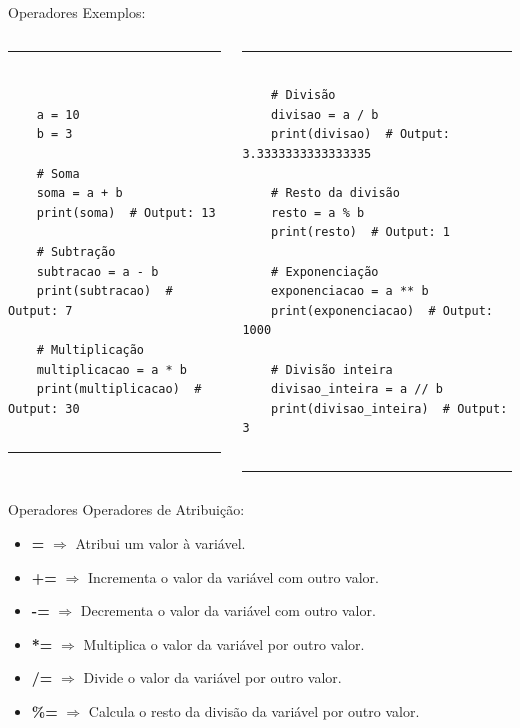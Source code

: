 \documentclass{beamer}
\begin{document}
\begin{frame}[fragile]{Operadores}
	\label{operadores_aritmeticos_exemplo}
	Exemplos:
	
	\begin{columns}
	\begin{column}{0.5\textwidth}
		
		\rule{\textwidth}{1pt}
		\scriptsize
\begin{verbatim}
	
	
	a = 10
	b = 3
	
	# Soma
	soma = a + b
	print(soma)  # Output: 13
	
	# Subtração
	subtracao = a - b
	print(subtracao)  # Output: 7
	
	# Multiplicação
	multiplicacao = a * b
	print(multiplicacao)  # Output: 30
	
\end{verbatim}
\rule{\textwidth}{1pt}
	\end{column}
	\begin{column}{0.5\textwidth}
		
		\rule{\textwidth}{1pt}
		\scriptsize
\begin{verbatim}
	
	# Divisão
	divisao = a / b
	print(divisao)  # Output: 3.3333333333333335

	# Resto da divisão
	resto = a % b
	print(resto)  # Output: 1
	
	# Exponenciação
	exponenciacao = a ** b
	print(exponenciacao)  # Output: 1000
	
	# Divisão inteira
	divisao_inteira = a // b
	print(divisao_inteira)  # Output: 3
	
\end{verbatim}

\rule{\textwidth}{1pt}
	\end{column}
\end{columns}
	
\end{frame}


\begin{frame}[fragile]{Operadores}
	\label{operadores_atribuicao}
	Operadores de Atribuição:
	
	\begin{itemize}
		 \item \textbf{=} $\Rightarrow$ Atribui um valor à variável.
		 \item \textbf{+=} $\Rightarrow$ Incrementa o valor da variável com outro valor.
		 \item \textbf{-=} $\Rightarrow$ Decrementa o valor da variável com outro valor.
		 \item \textbf{*=} $\Rightarrow$ Multiplica o valor da variável por outro valor.
		 \item \textbf{/=} $\Rightarrow$ Divide o valor da variável por outro valor.
		 \item \textbf{\%=} $\Rightarrow$ Calcula o resto da divisão da variável por outro valor.
	\end{itemize}

\end{frame}
\end{document}
